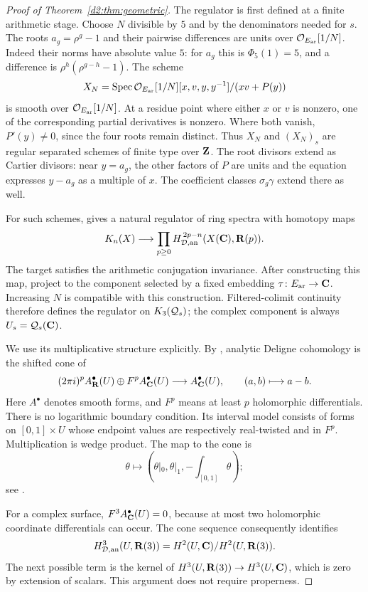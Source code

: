 \begin{proof}[Proof of Theorem~\ref{d2:thm:geometric}]
The regulator is first defined at a finite arithmetic stage.
Choose \(N\) divisible by \(5\) and by the denominators needed for
\(s\). The roots \(a_g=\rho^g-1\) and their pairwise differences are
units over \(\mathcal O_{E_{\mathrm{ar}}}[1/N]\).
Indeed their norms have absolute value \(5\):
for \(a_g\) this is \(\Phi_5(1)=5\), and a difference is
\(\rho^h(\rho^{g-h}-1)\).
The scheme
\[
 X_N=\operatorname{Spec}
 \mathcal O_{E_{\mathrm{ar}}}[1/N][x,v,y,y^{-1}]/(xv+P(y))
\]
is smooth over \(\mathcal O_{E_{\mathrm{ar}}}[1/N]\).
At a residue point where either \(x\) or \(v\) is nonzero, one of the
corresponding partial derivatives is nonzero.
Where both vanish, \(P'(y)\ne0\), since the four roots remain distinct.
Thus \(X_N\) and \((X_N)_s\) are regular separated schemes of finite
type over \(\mathbf{Z}\).
The root divisors extend as Cartier divisors: near \(y=a_g\), the
other factors of \(P\) are units and the equation expresses
\(y-a_g\) as a multiple of \(x\).
The coefficient classes \(\sigma_g\gamma\) extend there as well.

For such schemes, \cite[Theorem~2.31 and Remark~2.27]{BunkeTamme}
gives a natural regulator of ring spectra with homotopy maps
\[
 K_n(X)\longrightarrow
 \prod_{p\ge0}H_{\mathcal D,\mathrm{an}}^{\,2p-n}
                  (X(\mathbf{C}),\mathbf{R}(p)).
\]
The target satisfies the arithmetic conjugation invariance.
After constructing this map, project to the component selected by
a fixed embedding \(\tau\colon E_{\mathrm{ar}}\to\mathbf{C}\).
Increasing \(N\) is compatible with this construction.
Filtered-colimit continuity
\cite[IV, Section~6.4]{Weibel} therefore defines the regulator on
\(K_3(\mathcal Q_s)\); the complex component is always
\(U_s=\mathcal Q_s(\mathbf{C})\).

We use its multiplicative structure explicitly.
By \cite[Remark~2.6 and Definition~2.7]{BunkeTamme}, analytic
Deligne cohomology is the shifted cone of
\[
 (2\pi i)^pA_{\mathbf{R}}^\bullet(U)
       \oplus F^pA_{\mathbf{C}}^\bullet(U)
 \longrightarrow A_{\mathbf{C}}^\bullet(U),
 \qquad (a,b)\longmapsto a-b.
\]
Here \(A^\bullet\) denotes smooth forms, and \(F^p\) means at least
\(p\) holomorphic differentials. There is no logarithmic boundary
condition. Its interval model consists of forms on
\([0,1]\times U\) whose endpoint values are respectively real-twisted
and in \(F^p\).
Multiplication is wedge product.
The map to the cone is
\[
 \theta\longmapsto
 \left(\theta|_0,\theta|_1,-\int_{[0,1]}\theta\right);
\]
see \cite[Proposition~2.8 and Corollary~2.14]{BunkeTamme}.

For a complex surface, \(F^3A_{\mathbf{C}}^\bullet(U)=0\), because at most two
holomorphic coordinate differentials can occur.
The cone sequence consequently identifies
\begin{equation}\label{d2:eq:analytic-quotient}
 H_{\mathcal D,\mathrm{an}}^{3}(U,\mathbf{R}(3))
   =H^2(U,\mathbf{C})/H^2(U,\mathbf{R}(3)).
\end{equation}
The next possible term is the kernel of
\(H^3(U,\mathbf{R}(3))\to H^3(U,\mathbf{C})\), which is zero by extension of
scalars. This argument does not require properness.


\end{proof}
